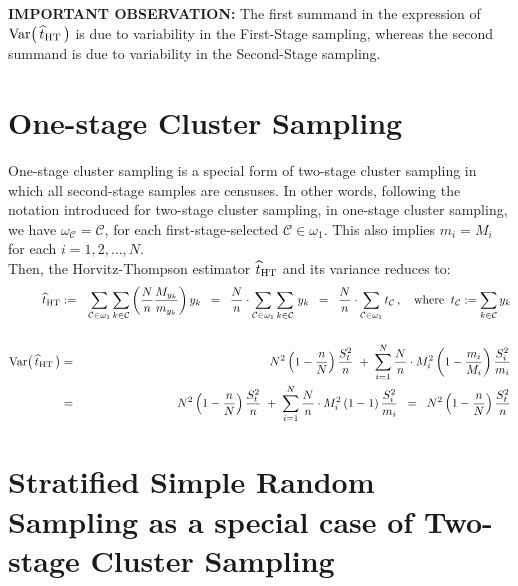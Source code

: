 \documentclass{article}
\begin{document}
\noindent
\textbf{IMPORTANT OBSERVATION:}\;\;
The first summand in the expression of $\textnormal{Var}\!\left(\,\widehat{t}_{\textnormal{HT}}\,\right)$ is due to variability in the First-Stage sampling, whereas the second summand is due to variability in the Second-Stage sampling.


\section{One-stage Cluster Sampling}
\setcounter{theorem}{0}

One-stage cluster sampling is a special form of two-stage cluster sampling in which all second-stage samples are censuses.  In other words, following the notation introduced for two-stage cluster sampling, in one-stage cluster sampling, we have $\omega_{\mathcal{C}} = \mathcal{C}$, for each first-stage-selected $\mathcal{C} \in \omega_{1}$.  This also implies $m_{i} = M_{i}$ for each $i = 1, 2, \ldots, N$. \\

Then, the Horvitz-Thompson estimator $\widehat{t}_{\textnormal{HT}}$ and its variance reduces to:
\begin{eqnarray*}
\widehat{t}_{\textnormal{HT}}
& := & \sum_{\mathcal{C}\in\omega_{1}} \sum_{k\in\mathcal{C}}\left(\dfrac{N}{n}\dfrac{M_{y_{k}}}{m_{y_{k}}}\right)y_{k}
\;\;=\;\; \dfrac{N}{n}\cdot\sum_{\mathcal{C}\in\omega_{1}} \sum_{k\in\mathcal{C}}\,y_{k} 
\;\;=\;\; \dfrac{N}{n}\cdot\sum_{\mathcal{C}\in\omega_{1}} t_{\mathcal{C}}\,,
\quad\textnormal{where}\;\; t_{\mathcal{C}} := \sum_{k\in\mathcal{C}}y_{k} \\
\\
\textnormal{Var}\!\left(\,\widehat{t}_{\textnormal{HT}}\,\right)
& = &
N^{2}\left(1-\dfrac{n}{N}\right)\dfrac{S^{2}_{t}}{n} \; + \; 
\sum^{N}_{i=1}\dfrac{N}{n}\cdot M_{i}^{2}\left(1-\dfrac{m_{i}}{M_{i}}\right)\dfrac{S^{2}_{i}}{m_{i}} \\
& = &
N^{2}\left(1-\dfrac{n}{N}\right)\dfrac{S^{2}_{t}}{n} \; + \; 
\sum^{N}_{i=1}\dfrac{N}{n}\cdot M_{i}^{2}\left(1-1\right)\dfrac{S^{2}_{i}}{m_{i}}
\;\;=\;\;
N^{2}\left(1-\dfrac{n}{N}\right)\dfrac{S^{2}_{t}}{n}
\end{eqnarray*}


\section{Stratified Simple Random Sampling as a special case of Two-stage Cluster Sampling}
\setcounter{theorem}{0}
\end{document}
